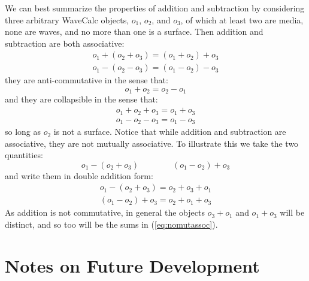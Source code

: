 \documentclass[11pt, reqno]{book}%
\newcounter{ct}
\newcommand{\es}{\begin{equation}}
\newcommand{\ef}{\end{equation} \vspace{0.05in}}
\begin{document}
We can best summarize the properties of addition and subtraction by considering three arbitrary WaveCalc objects, $o_1$, $o_2$, and $o_3$, of which at least two are media, none are waves, and no more than one is a surface. Then addition and subtraction are both associative:
\es
\begin{array}{l}
o_1 + (o_2 + o_3) = (o_1 + o_2) + o_3 \\
o_1 - (o_2 - o_3) = (o_1 - o_2) - o_3
\end{array}
\ef
\noindent they are anti-commutative in the sense that:
\es
o_1 + o_2 = o_2 - o_1
\ef
\noindent and they are collapsible in the sense that:
\es
\begin{array}{l}
o_1 +o_2 +o_3 = o_1 + o_3 \\
o_1 - o_2 - o_3 =o_1 - o_3
\end{array}
\ef
\noindent so long as $o_2$ is not a surface. Notice that while addition and subtraction are associative, they are not mutually associative. To illustrate this we take the two quantities:
\es
o_1 - (o_2+o_3) \quad \quad\quad \quad (o_1 -o_2) + o_3
\nonumber
\ef
\noindent and write them in double addition form:
\es
\begin{array}{l}
o_1 - (o_2 + o_3) = o_2 +o_3 + o_1  \\
(o_1 - o_2) + o_3 = o_2 +o_1 + o_3
\end{array}
\label{eq:nomutassoc}
\ef
\noindent As addition is not commutative, in general the objects $o_3+o_1$ and $o_1 + o_3$ will be distinct, and so too will be the sums in (\ref{eq:nomutassoc}).






















\chapter{Notes on Future Development}
\label{chap:scratch}
\end{document}
